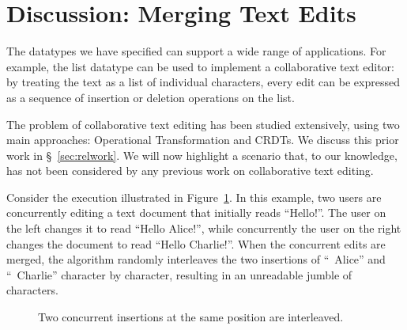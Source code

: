 \section{Discussion: Merging Text Edits}\label{sec:bad-merge}

The datatypes we have specified can support a wide range of applications.
For example, the list datatype can be used to implement a collaborative text editor: by treating the text as a list of individual characters, every edit can be expressed as a sequence of insertion or deletion operations on the list.

The problem of collaborative text editing has been studied extensively, using two main approaches: Operational Transformation and CRDTs.
We discuss this prior work in \S~\ref{sec:relwork}.
We will now highlight a scenario that, to our knowledge, has not been considered by any previous work on collaborative text editing.

Consider the execution illustrated in Figure~\ref{fig:bad-merge}.
In this example, two users are concurrently editing a text document that initially reads ``Hello!''.
The user on the left changes it to read ``Hello Alice!'', while concurrently the user on the right changes the document to read ``Hello Charlie!''.
When the concurrent edits are merged, the algorithm randomly interleaves the two insertions of ``~Alice'' and ``~Charlie'' character by character, resulting in an unreadable jumble of characters.

\begin{figure}
\centering
{}
\caption{Two concurrent insertions at the same position are interleaved.}\label{fig:bad-merge}
\end{figure}

